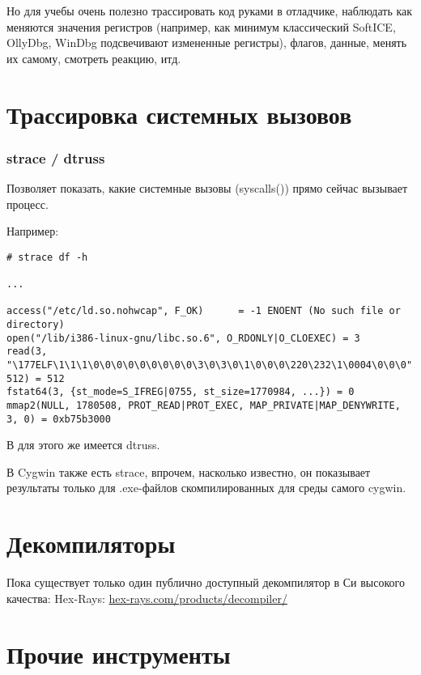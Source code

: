 Но для учебы очень полезно трассировать код руками в отладчике, наблюдать как меняются значения регистров 
(например, как минимум классический SoftICE, OllyDbg, WinDbg подсвечивают измененные регистры), 
флагов, данные, менять их самому, смотреть реакцию, итд.

\section{Трассировка системных вызовов}

\label{strace}
\subsubsection{strace / dtruss}

Позволяет показать, какие системные вызовы (syscalls()) прямо сейчас вызывает процесс.

Например:

\begin{lstlisting}
# strace df -h

...

access("/etc/ld.so.nohwcap", F_OK)      = -1 ENOENT (No such file or directory)
open("/lib/i386-linux-gnu/libc.so.6", O_RDONLY|O_CLOEXEC) = 3
read(3, "\177ELF\1\1\1\0\0\0\0\0\0\0\0\0\3\0\3\0\1\0\0\0\220\232\1\0004\0\0\0"..., 512) = 512
fstat64(3, {st_mode=S_IFREG|0755, st_size=1770984, ...}) = 0
mmap2(NULL, 1780508, PROT_READ|PROT_EXEC, MAP_PRIVATE|MAP_DENYWRITE, 3, 0) = 0xb75b3000
\end{lstlisting}

\myindex{\MacOSX}
В \MacOSX для этого же имеется dtruss.

В Cygwin также есть strace, впрочем, насколько известно, 
он показывает результаты только для .exe-файлов скомпилированных для среды самого cygwin.

\section{Декомпиляторы}

Пока существует только один публично доступный декомпилятор в Си высокого качества: Hex-Rays:
\href{http://go.yurichev.com/17033}{hex-rays.com/products/decompiler/}


\section{Прочие инструменты}

